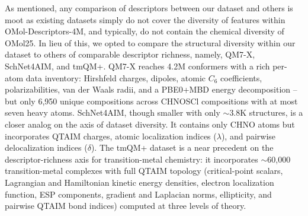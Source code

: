 As mentioned, any comparison of descriptors between our dataset and others is moot as existing datasets simply do not cover the diversity
of features within OMol-Descriptors-4M, and typically, do not contain the chemical diversity of OMol25. In lieu of this, we opted to compare
the structural diversity within our dataset to others of comparable descriptor richness, namely, QM7-X, SchNet4AIM, and tmQM+.
QM7-X \citep{qm7x} reaches 4.2M conformers with a rich per-atom data
inventory: Hirshfeld charges, dipoles, atomic $C_{6}$ coefficients,
polarizabilities, van der Waals radii, and a PBE0+MBD energy
decomposition -- but only 6{,}950 unique compositions across CHNOSCl compositions
with at most seven heavy atoms. SchNet4AIM\citep{schnet4aim}, though smaller with only $\sim$3.8K structures, is a closer
analog on the axis of dataset diversity. It contains only CHNO atoms but incorporates QTAIM charges, 
atomic localization indices ($\lambda$), and pairwise
delocalization indices ($\delta$). The tmQM+ dataset \citep{D5DD00220F} is a near precedent on the
descriptor-richness axis for transition-metal chemistry: it incorporates
$\sim$60{,}000 transition-metal complexes with full QTAIM topology
(critical-point scalars, Lagrangian and Hamiltonian kinetic energy
densities, electron localization function, ESP components, gradient and
Laplacian norms, ellipticity, and pairwise QTAIM bond indices) computed
at three levels of theory. 


